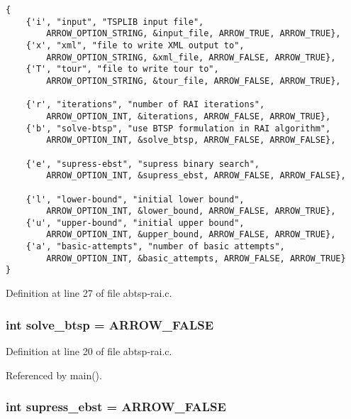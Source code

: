 \begin{Code}\begin{verbatim} 
{
    {'i', "input", "TSPLIB input file", 
        ARROW_OPTION_STRING, &input_file, ARROW_TRUE, ARROW_TRUE},
    {'x', "xml", "file to write XML output to",
        ARROW_OPTION_STRING, &xml_file, ARROW_FALSE, ARROW_TRUE},
    {'T', "tour", "file to write tour to",
        ARROW_OPTION_STRING, &tour_file, ARROW_FALSE, ARROW_TRUE},
    
    {'r', "iterations", "number of RAI iterations",
        ARROW_OPTION_INT, &iterations, ARROW_FALSE, ARROW_TRUE},
    {'b', "solve-btsp", "use BTSP formulation in RAI algorithm",
        ARROW_OPTION_INT, &solve_btsp, ARROW_FALSE, ARROW_FALSE},
        
    {'e', "supress-ebst", "supress binary search",
        ARROW_OPTION_INT, &supress_ebst, ARROW_FALSE, ARROW_FALSE},
        
    {'l', "lower-bound", "initial lower bound",
        ARROW_OPTION_INT, &lower_bound, ARROW_FALSE, ARROW_TRUE},
    {'u', "upper-bound", "initial upper bound",
        ARROW_OPTION_INT, &upper_bound, ARROW_FALSE, ARROW_TRUE},
    {'a', "basic-attempts", "number of basic attempts",
        ARROW_OPTION_INT, &basic_attempts, ARROW_FALSE, ARROW_TRUE}
}
\end{verbatim}
\end{Code}


Definition at line 27 of file abtsp-rai.c.\hypertarget{abtsp-rai_8c_de7f7731dd87b73e02ed30fd099d5cc5}{
\subsubsection[{solve\_\-btsp}]{\setlength{\rightskip}{0pt plus 5cm}int {\bf solve\_\-btsp} = ARROW\_\-FALSE}}
\label{abtsp-rai_8c_de7f7731dd87b73e02ed30fd099d5cc5}




Definition at line 20 of file abtsp-rai.c.

Referenced by main().\hypertarget{abtsp-rai_8c_502a0aac74d070b870b1c096d9d8520d}{
\subsubsection[{supress\_\-ebst}]{\setlength{\rightskip}{0pt plus 5cm}int {\bf supress\_\-ebst} = ARROW\_\-FALSE}}
\label{abtsp-rai_8c_502a0aac74d070b870b1c096d9d8520d}




